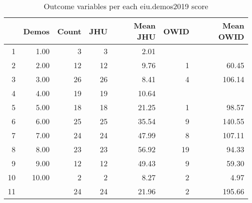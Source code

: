 \begin{table}[ht]
\centering
\caption{Outcome variables per each eiu.demos2019 score} 
\begingroup\footnotesize
\begin{tabular}{rrrrrrr}
  \hline
 & Demos & Count & JHU & Mean JHU & OWID & Mean OWID \\ 
  \hline
1 & 1.00 &   3 &   3 & 2.01 &  &  \\ 
  2 & 2.00 &  12 &  12 & 9.76 &   1 & 60.45 \\ 
  3 & 3.00 &  26 &  26 & 8.41 &   4 & 106.14 \\ 
  4 & 4.00 &  19 &  19 & 10.64 &  &  \\ 
  5 & 5.00 &  18 &  18 & 21.25 &   1 & 98.57 \\ 
  6 & 6.00 &  25 &  25 & 35.54 &   9 & 140.55 \\ 
  7 & 7.00 &  24 &  24 & 47.99 &   8 & 107.11 \\ 
  8 & 8.00 &  23 &  23 & 56.92 &  19 & 94.33 \\ 
  9 & 9.00 &  12 &  12 & 49.43 &   9 & 59.30 \\ 
  10 & 10.00 &   2 &   2 & 8.27 &   2 & 4.97 \\ 
  11 &  &  24 &  24 & 21.96 &   2 & 195.66 \\ 
   \hline
\end{tabular}
\endgroup
\end{table}
